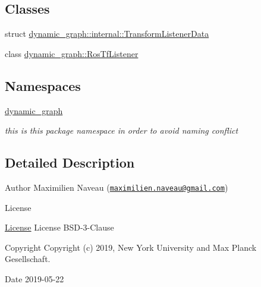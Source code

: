 \subsection*{Classes}
\begin{DoxyCompactItemize}
\item 
struct \hyperlink{structdynamic__graph_1_1internal_1_1TransformListenerData}{dynamic\+\_\+graph\+::internal\+::\+Transform\+Listener\+Data}
\item 
class \hyperlink{classdynamic__graph_1_1RosTfListener}{dynamic\+\_\+graph\+::\+Ros\+Tf\+Listener}
\end{DoxyCompactItemize}
\subsection*{Namespaces}
\begin{DoxyCompactItemize}
\item 
 \hyperlink{namespacedynamic__graph}{dynamic\+\_\+graph}
\begin{DoxyCompactList}\small\item\em this is this package namespace in order to avoid naming conflict \end{DoxyCompactList}\end{DoxyCompactItemize}


\subsection{Detailed Description}
\begin{DoxyAuthor}{Author}
Maximilien Naveau (\href{mailto:maximilien.naveau@gmail.com}{\tt maximilien.\+naveau@gmail.\+com}) 
\end{DoxyAuthor}
\begin{DoxyRefDesc}{License}
\item[\hyperlink{license__license000029}{License}]License B\+S\+D-\/3-\/\+Clause \end{DoxyRefDesc}
\begin{DoxyCopyright}{Copyright}
Copyright (c) 2019, New York University and Max Planck Gesellschaft. 
\end{DoxyCopyright}
\begin{DoxyDate}{Date}
2019-\/05-\/22 
\end{DoxyDate}
